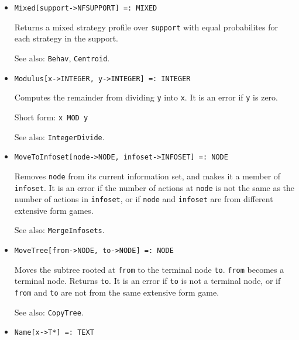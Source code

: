 \begin{itemize}
\item{}
\protect \large \begin{verbatim}
Mixed[support->NFSUPPORT] =: MIXED 
\end{verbatim}\normalsize

\bd
Returns a mixed strategy profile over \verb+support+ with equal
probabilites for each strategy in the support.  
\item [See also:] \verb+Behav+, \verb+Centroid+.
\ed

\item{}
\protect \large \begin{verbatim}
Modulus[x->INTEGER, y->INTEGER] =: INTEGER 
\end{verbatim}\normalsize

\bd
Computes the remainder from dividing \verb+y+ into \verb+x+.  It is an
error if \verb+y+ is zero.
\item [Short form:] \verb+x MOD y+
\item [See also:] \verb+IntegerDivide+.
\ed


\item{}
\protect \large \begin{verbatim}
MoveToInfoset[node->NODE, infoset->INFOSET] =: NODE 
\end{verbatim}\normalsize

\bd
Removes \verb+node+ from its current information set, and makes it a
member of \verb+infoset+. It is an error if the number of actions at
\verb+node+ is not the same as the number of actions in
\verb+infoset+, or if \verb+node+ and \verb+infoset+ are from
different extensive form games.   
\item [See also:] \verb+MergeInfosets+.
\ed


\item{}
\protect \large \begin{verbatim}
MoveTree[from->NODE, to->NODE] =: NODE 
\end{verbatim}\normalsize

\bd
Moves the subtree rooted at \verb+from+ to
the terminal node \verb+to+.  \verb+from+ becomes a terminal node.
Returns \verb+to+.  It is an error if \verb+to+ is not a terminal
node, or if \verb+from+ and \verb+to+ are not from the same extensive
form game.
\item [See also:] \verb+CopyTree+.
\ed


\item{}
\protect \large \begin{verbatim}
Name[x->T*] =: TEXT
\end{verbatim}\normalsize


\end{itemize}
